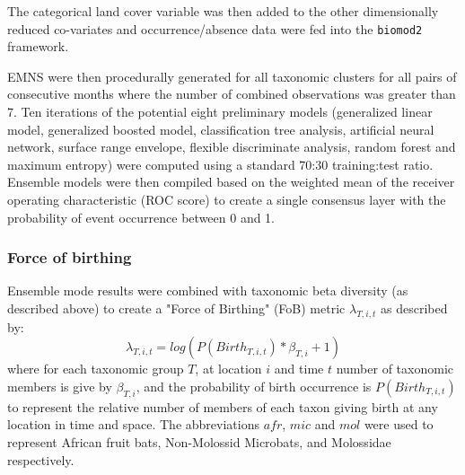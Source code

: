 \documentclass[9pt,twoside,lineno]{pnas-new}
\begin{document}
The categorical land cover variable was then added to the other dimensionally reduced co-variates and occurrence/absence data were fed into the \texttt{biomod2} framework.\par
EMNS were then procedurally generated for all taxonomic clusters for all pairs of consecutive months where the number of combined observations was greater than 7. Ten iterations of the potential eight preliminary models (generalized linear model, generalized boosted model, classification tree analysis, artificial neural network, surface range envelope, flexible discriminate analysis, random forest and maximum entropy) were computed using a standard 70:30 training:test ratio. Ensemble models were then compiled based on the weighted mean of the receiver operating characteristic (ROC score) to create a single consensus layer with the probability of event occurrence between 0 and 1.\par
\subsubsection*{Force of birthing}
Ensemble mode results were combined with taxonomic beta diversity (as described above) to create a "Force of Birthing" (FoB) metric $\lambda_{T,i,t}$ as described by:
\[
  	    \lambda_{T,i,t} = log(P(Birth_{T,i,t})*\beta_{T,i} +1)
\]
where for each taxonomic group $T$, at location $i$ and time $t$ number of taxonomic members is give by $\beta_{T,i}$, and the probability of birth occurrence is $P(Birth_{T,i,t})$ to represent the relative number of members of each taxon giving birth at any location in time and space. The abbreviations $afr$, $mic$ and $mol$ were used to represent African fruit bats, Non-Molossid Microbats, and Molossidae respectively. \par 
\end{document}
